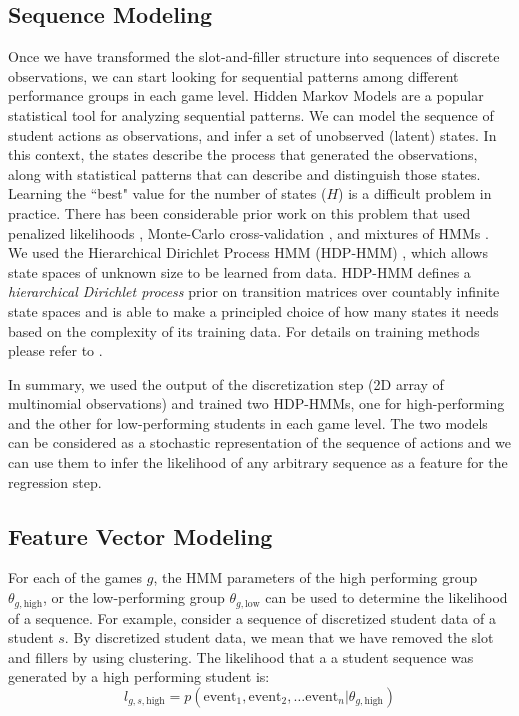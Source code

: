 \documentclass{sigchi}
\begin{document}
	\subsection{Sequence Modeling}
	Once we have transformed the slot-and-filler structure into sequences of discrete observations, we can start looking for sequential patterns among different performance groups in each game level.
	Hidden Markov Models are a popular statistical tool for analyzing sequential patterns.
	We can model the sequence of student actions as observations,
	and infer a set of unobserved (latent) states.
	In this context, the states describe the process that generated the observations, along with statistical patterns that can describe and distinguish those states.
	Learning the ``best" value for the number of states ($H$) is a difficult problem in practice. 
	There has been considerable prior work on this problem that used penalized likelihoods \cite{rabiner1989hmm}, Monte-Carlo cross-validation \cite{smyth1996clustering}, and mixtures of HMMs \cite{smyth1997clustering}.
	We used the Hierarchical Dirichlet Process HMM (HDP-HMM) \cite{fox2008hdp}, which allows state spaces of unknown size to be learned from data. 
	HDP-HMM defines a \textit{hierarchical Dirichlet process} prior on transition matrices over countably infinite state spaces and is able to make a principled choice of how many states it needs based on the complexity of its training data. 
	For details on training methods please refer to \cite{fox2008hdp}.
	
	In summary, we used the output of the discretization step (2D array of multinomial observations) and trained two HDP-HMMs, one for high-performing and the other for low-performing students in each game level. 
	The two models can be considered as a stochastic representation of the sequence of actions and we can use them to infer the likelihood of any arbitrary sequence as a feature for the regression step. 
	
	\subsection{Feature Vector Modeling}


	For each of the games $g$, the HMM parameters  of the high performing group $\theta_{g,\text{high}}$, or the low-performing group  $\theta_{g,\text{low}}$ can be used to determine the likelihood of a sequence.
	For example,	consider a sequence of discretized student data of a student $s$.
	By discretized student data, we mean that we have removed the slot and fillers by using clustering.
	The likelihood that  a a student sequence was generated by a high performing student is:
	\begin{equation}
	 l_{g, s, \text{high}} =  p( \text{event}_1,\text{event}_2, \dots \text{event}_n | \theta_{g,\text{high}} ) 
	\end{equation}
	
\end{document}
